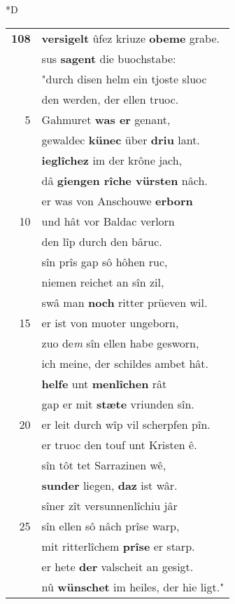 \documentclass[8pt,a4paper,notitlepage]{article}
\begin{document}
\begin{table}[ht]
\begin{minipage}[t]{0.5\linewidth}
\small
\begin{center}*D
\end{center}
\begin{tabular}{rl}
\textbf{108} & \textbf{versigelt} ûfez kriuze \textbf{obeme} grabe.\\ 
 & sus \textbf{sagent} die buochstabe:\\ 
 & "durch disen helm ein tjoste sluoc\\ 
 & den werden, der ellen truoc.\\ 
5 & Gahmuret \textbf{was er} genant,\\ 
 & gewaldec \textbf{künec} über \textbf{driu} lant.\\ 
 & \textbf{ieglîchez} im der krône jach,\\ 
 & dâ \textbf{giengen rîche vürsten} nâch.\\ 
 & er was von Anschouwe \textbf{erborn}\\ 
10 & und hât vor Baldac verlorn\\ 
 & den lîp durch den bâruc.\\ 
 & sîn prîs gap sô hôhen ruc,\\ 
 & niemen reichet an sîn zil,\\ 
 & swâ man \textbf{noch} ritter prüeven wil.\\ 
15 & er ist von muoter ungeborn,\\ 
 & zuo de\textit{m} sîn ellen habe gesworn,\\ 
 & ich meine, der schildes ambet hât.\\ 
 & \textbf{helfe} unt \textbf{menlîchen} rât\\ 
 & gap er mit \textbf{stæte} vriunden sîn.\\ 
20 & er leit durch wîp vil scherpfen pîn.\\ 
 & er truoc den touf unt Kristen ê.\\ 
 & sîn tôt tet Sarrazinen wê,\\ 
 & \textbf{sunder} liegen, \textbf{daz} ist wâr.\\ 
 & sîner zît versunnenlîchiu jâr\\ 
25 & sîn ellen sô nâch prîse warp,\\ 
 & mit ritterlîchem \textbf{prîse} er starp.\\ 
 & er hete \textbf{der} valscheit an gesigt.\\ 
 & nû \textbf{wünschet} im heiles, der hie ligt."\\ 

\end{tabular}
\end{minipage}
\end{table}
\end{document}
